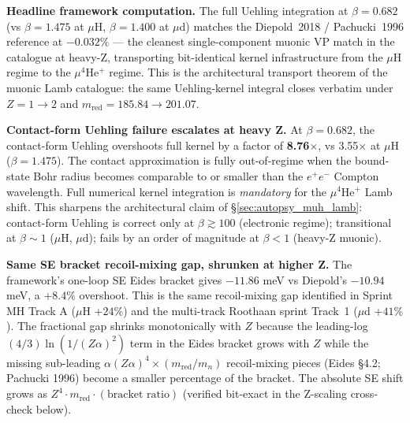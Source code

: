 \documentclass[11pt]{article}
\begin{document}
\textbf{Headline framework computation.}  The full Uehling integration
at $\beta = 0.682$ (vs $\beta = 1.475$ at $\mu$H, $\beta = 1.400$ at
$\mu$d) matches the Diepold~2018 / Pachucki~1996 reference at
$-0.032\%$ --- the cleanest single-component muonic VP match in
the catalogue at heavy-Z, transporting bit-identical kernel
infrastructure from the $\mu$H regime to the $\mu^4$He$^+$ regime.
This is the architectural transport theorem of the muonic Lamb
catalogue: the same Uehling-kernel integral closes verbatim under
$Z = 1 \to 2$ and $m_\text{red} = 185.84 \to 201.07$.

\textbf{Contact-form Uehling failure escalates at heavy Z.}  At
$\beta = 0.682$, the contact-form Uehling overshoots full kernel by a
factor of \textbf{8.76$\times$}, vs 3.55$\times$ at $\mu$H ($\beta = 1.475$).
The contact approximation is fully out-of-regime when the bound-state
Bohr radius becomes comparable to or smaller than the $e^+ e^-$
Compton wavelength.  Full numerical kernel integration is
\emph{mandatory} for the $\mu^4$He$^+$ Lamb shift.  This sharpens
the architectural claim of \S\ref{sec:autopsy_muh_lamb}: contact-form
Uehling is correct only at $\beta \gtrsim 100$ (electronic regime);
transitional at $\beta \sim 1$ ($\mu$H, $\mu$d); fails by an order of
magnitude at $\beta < 1$ (heavy-Z muonic).

\textbf{Same SE bracket recoil-mixing gap, shrunken at higher Z.}  The
framework's one-loop SE Eides bracket gives $-11.86$ meV vs Diepold's
$-10.94$ meV, a $+8.4\%$ overshoot.  This is the same recoil-mixing gap
identified in Sprint MH Track A ($\mu$H $+24\%$) and the multi-track
Roothaan sprint Track~1 ($\mu$d $+41\%$).  The fractional gap shrinks
monotonically with $Z$ because the leading-log $(4/3)\ln(1/(Z\alpha)^2)$
term in the Eides bracket grows with $Z$ while the missing sub-leading
$\alpha(Z\alpha)^4 \times (m_\text{red}/m_n)$ recoil-mixing pieces
(Eides \S 4.2; Pachucki 1996) become a smaller percentage of the bracket.
The absolute SE shift grows as $Z^4 \cdot m_\text{red} \cdot (\text{bracket
ratio})$ (verified bit-exact in the Z-scaling cross-check below).
\end{document}
